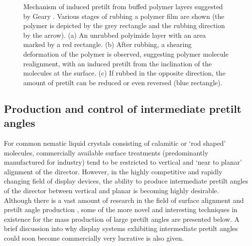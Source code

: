 \begin{figure}
\begin{center}
\end{center}
\caption[Schematic diagram of proposed mechanism behind production of pretilt from rubbed polymer layers]{\label{fig:rubbedpolymer}Mechanism of induced pretilt from buffed polymer layers suggested by Geary \cite{Geary1987}. Various stages of rubbing a polymer film are shown (the polymer is depicted by the grey rectangle and the rubbing direction by the arrow). (a) An unrubbed polyimide layer with an area marked by a red rectangle. (b) After rubbing, a shearing deformation of the polymer is observed, suggesting polymer molecule realignment, with an induced pretilt from the inclination of the molecules at the surface. (c) If rubbed in the opposite direction, the amount of pretilt can be reduced or even reversed (blue rectangle).}
\end{figure}

\subsection{Production and control of intermediate pretilt angles}
For common nematic liquid crystals consisting of calamitic or `rod shaped' molecules, commercially  available surface treatments (predominantly manufactured for industry) tend to be restricted to vertical and `near to planar' alignment of the director. However, in the highly competitive and rapidly changing field of display devices, the ability to produce intermediate pretilt angles of the director between vertical and planar is becoming highly desirable. Although there is a vast amount of research in the field of surface alignment and pretilt angle production \cite{Nov1987,Fuh2009,Honma2007,Kim2002,Paek1998,Reznikov2000,Sakamoto1996,Search1991,Shah2001}, some of the more novel and interesting techniques in existence for the mass production of large pretilt angles are presented below. A brief discussion into why display systems exhibiting intermediate pretilt angles could soon become commercially very lucrative is also given.

